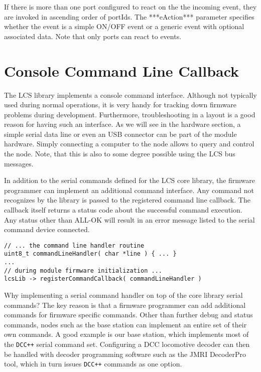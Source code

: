 If there is more than one port configured to react on the the incoming event, they are invoked in ascending order of portIds. The ***eAction*** parameter specifies whether the event is a simple ON/OFF event or a generic event with optional associated data. Note that only ports can react to events.

\section{Console Command Line Callback}

The LCS library implements a console command interface. Although not typically used during normal operations, it is very handy for tracking down firmware problems during development. Furthermore, troubleshooting in a layout is a good reason for having such an interface. As we will see in the hardware section, a simple serial data line or even an USB connector can be part of the module hardware. Simply connecting a computer to the node allows to query and control the node. Note, that this is also to some degree possible using the LCS bus messages.

In addition to the serial commands defined for the LCS  core library, the firmware programmer can implement an additional command interface. Any command not recognizes by the library is passed to the registered command line callback. The callback itself returns a status code about the successful command execution. Any status other than ALL-OK will result in an error message listed to the serial command device connected.

\lstset{style=codesnippetstyle}
\begin{lstlisting}
// ... the command line handler routine
uint8_t commandLineHandler( char *line ) { ... }
...
// during module firmware initialization ...
lcsLib -> registerCommandCallback( commandLineHandler )
\end{lstlisting}

Why implementing a serial command handler on top of the core library serial commands? The key reason is that a firmware programmer can add additional commands for firmware specific commands. Other than further debug and status commands, nodes such as the base station can implement an entire set of their own commands. A good example is our base station, which implements most of the \texttt{DCC++} serial command set. Configuring a DCC locomotive decoder can then be handled with decoder programming software such as the JMRI DecoderPro tool, which in turn issues \texttt{DCC++} commands as one option.


